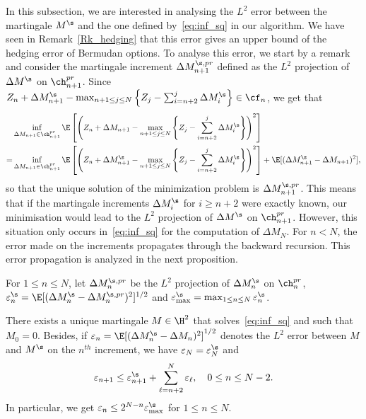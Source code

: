 In this subsection, we are interested in analysing the $L^2$ error between the martingale $M^\s$ and the one defined by~\eqref{eq:inf_sq} in our algorithm. We have seen in Remark~\ref{Rk_hedging} that this error gives an upper bound of the hedging error of Bermudan options. To analyse this error, we start by a remark and consider  the martingale increment $\Delta M^{\s,pr}_{n+1}$ defined as the $L^2$ projection of $\Delta M^\s$ on $\ch_{n+1}^{pr}$. Since 
$Z_{n} + \Delta M^\s_{n+1}  - \max_{n + 1\le j \le N} \left\{Z_{j} - \sum_{i=n+2}^{j} \Delta M^\s_i\right\} \in \cf_n$, we get that 
\begin{align*}   &\inf_{\Delta M_{n+1} \in \ch^{pr}_{n+1}}\E\left[ \left( Z_{n} + \Delta M_{n+1}  - \max_{n + 1\le j \le N} \left\{Z_{j} - \sum_{i=n+2}^{j} \Delta M^\s_i\right\}\right)^2\right] \\
  =&\inf_{\Delta M_{n+1} \in \ch^{pr}_{n+1}}\E\left[ \left( Z_{n} + \Delta M^\s_{n+1}  - \max_{n + 1\le j \le N} \left\{Z_{j} - \sum_{i=n+2}^{j} \Delta M^\s_i\right\}\right)^2\right] +\E[(\Delta M^\s_{n+1}-\Delta M_{n+1})^2],
  \end{align*}
so that  the unique solution of the minimization problem is $\Delta M^{\s,pr}_{n+1}$.
This means that if the martingale increments $\Delta M^\s_i$ for $i\ge n+2$ were exactly known, our minimisation would lead to the $L^2$ projection of $\Delta M^\s$ on $\ch_{n+1}^{pr}$. However, this situation only occurs in~\eqref{eq:inf_sq} for the computation of $\Delta M_N$. For $n<N$, the error made on the increments propagates through the backward recursion. This error propagation is analyzed in the next proposition.
\begin{proposition}\label{prop_errorL2}
  For $1\le n \le N$, let $\Delta M^{\s,pr}_{n}$ be the $L^2$ projection of $\Delta M^\s_n$ on $\ch_{n}^{pr}$, $\varepsilon^\s_n=\E[(\Delta M^\s_n-\Delta M^{\s,pr}_n)^2]^{1/2}$ and $\varepsilon^\s_{\max}=\max_{1\le n \le N} \varepsilon^\s_n$.
  
  There exists a unique martingale $M\in \H^2$ that solves~\eqref{eq:inf_sq} and such that $M_0=0$. Besides, if $\varepsilon_n=\E[(\Delta M^\s_n-\Delta M_n)^2]^{1/2}$ denotes the $L^2$ error between $M$ and $M^\s$ on the $n^{th}$ increment, we have $\varepsilon_N=\varepsilon^\s_N$ and 
\begin{equation}\label{rec_error} \varepsilon_{n+1}\le \varepsilon_{n+1}^\s + \sum_{\ell=n+2}^{N} \varepsilon_\ell , \quad 0\le n\le N-2.
\end{equation}
In particular, we get $\varepsilon_n \le 2^{N-n}\varepsilon^\s_{\max}$ for $1\le n\le N$.
\end{proposition}

